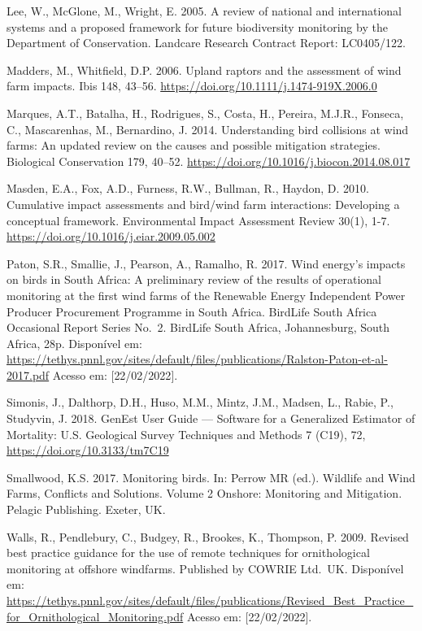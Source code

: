 \documentclass[
  oneside]{scrbook}
\begin{document}
Lee, W., McGlone, M., Wright, E. 2005. A review of national and international systems and a proposed framework for future biodiversity monitoring by the Department of Conservation. Landcare Research Contract Report: LC0405/122.

Madders, M., Whitfield, D.P. 2006. Upland raptors and the assessment of wind farm impacts. Ibis 148, 43--56. \url{https://doi.org/10.1111/j.1474-919X.2006.0}

Marques, A.T., Batalha, H., Rodrigues, S., Costa, H., Pereira, M.J.R., Fonseca, C., Mascarenhas, M., Bernardino, J. 2014. Understanding bird collisions at wind farms: An updated review on the causes and possible mitigation strategies. Biological Conservation 179, 40--52. \url{https://doi.org/10.1016/j.biocon.2014.08.017}

Masden, E.A., Fox, A.D., Furness, R.W., Bullman, R., Haydon, D. 2010. Cumulative impact assessments and bird/wind farm interactions: Developing a conceptual framework. Environmental Impact Assessment Review 30(1), 1-7. \url{https://doi.org/10.1016/j.eiar.2009.05.002}

Paton, S.R., Smallie, J., Pearson, A., Ramalho, R. 2017. Wind energy's impacts on birds in South Africa: A preliminary review of the results of operational monitoring at the first wind farms of the Renewable Energy Independent Power Producer Procurement Programme in South Africa. BirdLife South Africa Occasional Report Series No.~2. BirdLife South Africa, Johannesburg, South Africa, 28p. Disponível em: \url{https://tethys.pnnl.gov/sites/default/files/publications/Ralston-Paton-et-al-2017.pdf} Acesso em: {[}22/02/2022{]}.

Simonis, J., Dalthorp, D.H., Huso, M.M., Mintz, J.M., Madsen, L., Rabie, P., Studyvin, J. 2018. GenEst User Guide --- Software for a Generalized Estimator of Mortality: U.S. Geological Survey Techniques and Methods 7 (C19), 72, \url{https://doi.org/10.3133/tm7C19}

Smallwood, K.S. 2017. Monitoring birds. In: Perrow MR (ed.). Wildlife and Wind Farms, Conflicts and Solutions. Volume 2 Onshore: Monitoring and Mitigation. Pelagic Publishing. Exeter, UK.

Walls, R., Pendlebury, C., Budgey, R., Brookes, K., Thompson, P. 2009. Revised best practice guidance for the use of remote techniques for ornithological monitoring at offshore windfarms. Published by COWRIE Ltd.~UK. Disponível em: \url{https://tethys.pnnl.gov/sites/default/files/publications/Revised_Best_Practice_for_Ornithological_Monitoring.pdf} Acesso em: {[}22/02/2022{]}.
\end{document}
